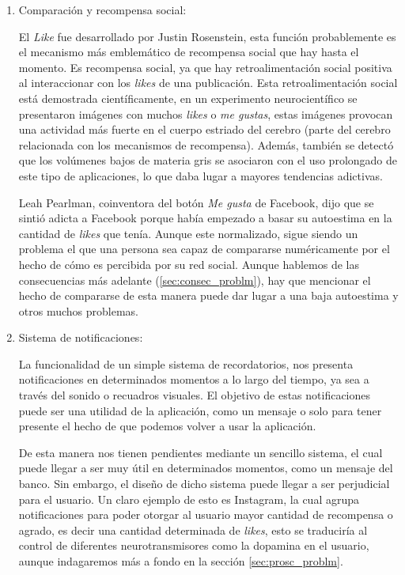 \begin{enumerate}
    \item Comparación y recompensa social:

    El \textit{Like} fue desarrollado por Justin Rosenstein, esta función probablemente es el mecanismo más emblemático de recompensa social que hay hasta el momento. Es recompensa social, ya que hay retroalimentación social positiva al interaccionar con los \textit{likes} de una publicación. Esta retroalimentación social está demostrada científicamente, en un experimento neurocientífico se presentaron imágenes con muchos \textit{likes} o \textit{me gustas}, estas imágenes provocan una actividad más fuerte en el cuerpo estriado del cerebro (parte del cerebro relacionada con los mecanismos de recompensa). Además, también se detectó que los volúmenes bajos de materia gris se asociaron con el uso prolongado de este tipo de aplicaciones, lo que daba lugar a mayores tendencias adictivas. \cite{MONTAG2017221,sherman2018peer}

    Leah Pearlman, coinventora del botón \textit{Me gusta} de Facebook, dijo que se sintió adicta a Facebook porque había empezado a basar su autoestima en la cantidad de \textit{likes} que tenía. \cite{Social-Deliberately} Aunque este normalizado, sigue siendo un problema el que una persona sea capaz de compararse numéricamente por el hecho de cómo es percibida por su red social. Aunque hablemos de las consecuencias más adelante (\ref{sec:consec_problm}), hay que mencionar el hecho de compararse de esta manera puede dar lugar a una baja autoestima y otros muchos problemas.

    \item Sistema de notificaciones:

    La funcionalidad de un simple sistema de recordatorios, nos presenta notificaciones en determinados momentos a lo largo del tiempo, ya sea a través del sonido o recuadros visuales. El objetivo de estas notificaciones puede ser una utilidad de la aplicación, como un mensaje o solo para tener presente el hecho de que podemos volver a usar la aplicación.
    
    De esta manera nos tienen pendientes mediante un sencillo sistema, el cual puede llegar a ser muy útil en determinados momentos, como un mensaje del banco. Sin embargo, el diseño de dicho sistema puede llegar a ser perjudicial para el usuario. Un claro ejemplo de esto es Instagram, la cual agrupa notificaciones para poder otorgar al usuario mayor cantidad de recompensa o agrado, es decir una cantidad determinada de \textit{likes}, esto se traduciría al control de diferentes neurotransmisores como la dopamina en el usuario, aunque indagaremos más a fondo en la sección \ref{sec:prosc_problm}.

\end{enumerate}

